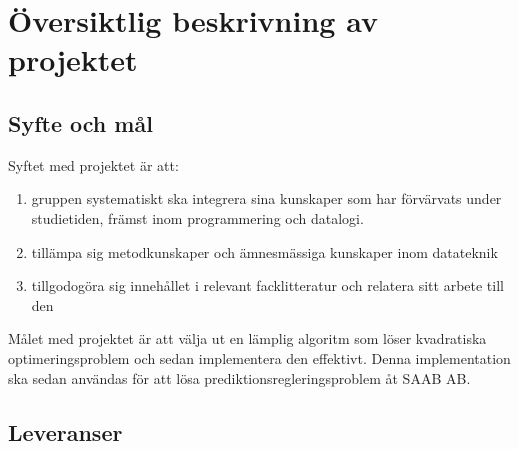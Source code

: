 \section{Översiktlig beskrivning av projektet}


\subsection{Syfte och mål}
Syftet med projektet är att:
\begin{enumerate}
 \item gruppen systematiskt ska integrera sina kunskaper som har förvärvats under studietiden, främst inom programmering och datalogi. 
 \item tillämpa sig  metodkunskaper och ämnesmässiga kunskaper inom datateknik
 \item tillgodogöra sig innehållet i relevant facklitteratur och relatera sitt arbete till den
\end{enumerate}

Målet med projektet är att välja ut en lämplig algoritm som löser kvadratiska optimeringsproblem och sedan implementera den effektivt. Denna implementation ska sedan användas för att lösa prediktionsregleringsproblem åt SAAB AB. 

\subsection{Leveranser}

